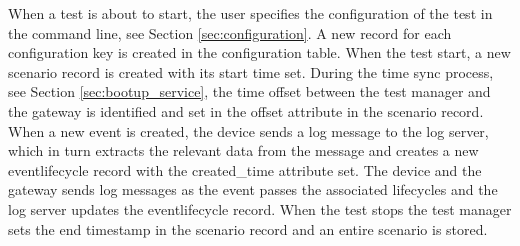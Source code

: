 When a test is about to start, the user specifies the configuration of the test
in the command line, see Section \ref{sec:configuration}. A new record for each
configuration key is created in the configuration table. When the test start, a
new scenario record is created with its start time set.  During the time sync
process, see Section \ref{sec:bootup_service}, the time offset between the test
manager and the gateway is identified and set in the offset attribute in the
scenario record. When a new event is created, the device sends a log message to
the log server, which in turn extracts the relevant data from the message and
creates a new eventlifecycle record with the created\_time attribute set. The
device and the gateway sends log messages as the event passes the associated
lifecycles and the log server updates the eventlifecycle record. When the test
stops the test manager sets the end timestamp in the scenario record and an
entire scenario is stored.

